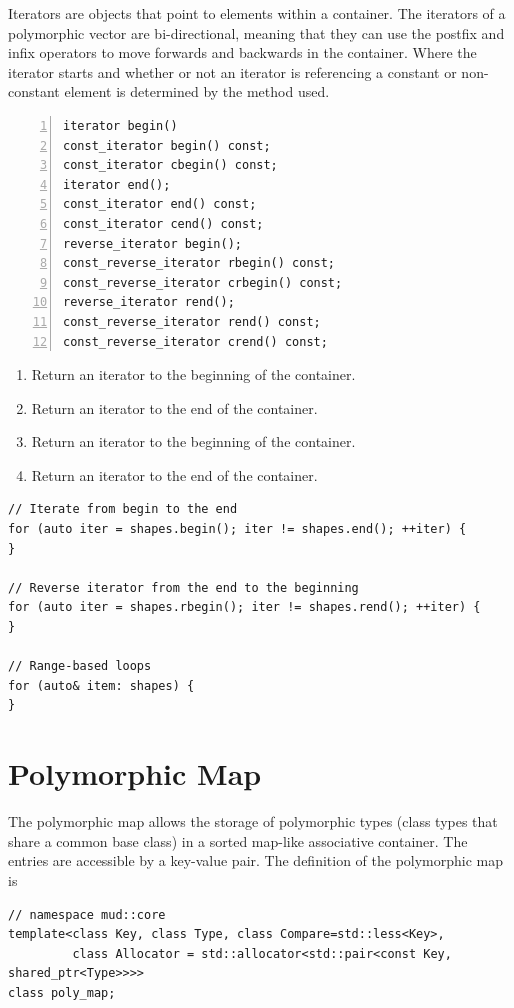 \documentclass[10pt,a4paper,openany]{mudbook}
\newenvironment{enumeratedef}
  {\begin{enumerate}[topsep=0.5em,itemsep=0em,parsep=0em,font=\small]
     \small}
  {\end{enumerate}}
\begin{document}
Iterators are objects that point to elements within a container. The iterators
of a polymorphic vector are bi-directional, meaning that they can use the
postfix and infix operators to move forwards and backwards in the container.
Where the iterator starts and whether or not an iterator is referencing a
constant or non-constant element is determined by the method used.

\begin{lstlisting}[style=definition,numbers=left]
iterator begin()
const_iterator begin() const;
const_iterator cbegin() const;
iterator end();
const_iterator end() const;
const_iterator cend() const;
reverse_iterator begin();
const_reverse_iterator rbegin() const;
const_reverse_iterator crbegin() const;
reverse_iterator rend();
const_reverse_iterator rend() const;
const_reverse_iterator crend() const;
\end{lstlisting}
\begin{enumeratedef}
  \item[1-3] Return an iterator to the beginning of the container.
  \item[4-6] Return an iterator to the end of the container.
  \item[7-9] Return an iterator to the beginning of the container.
  \item[10-12] Return an iterator to the end of the container.
\end{enumeratedef}

\begin{lstlisting}[style=snippet]
// Iterate from begin to the end
for (auto iter = shapes.begin(); iter != shapes.end(); ++iter) {
}

// Reverse iterator from the end to the beginning
for (auto iter = shapes.rbegin(); iter != shapes.rend(); ++iter) {
}

// Range-based loops
for (auto& item: shapes) {
}
\end{lstlisting}

\section{Polymorphic Map}
\label{sct:poly_map}

The polymorphic map allows the storage of polymorphic types (class types
that share a common base class) in a sorted map-like associative container. The
entries are accessible by a key-value pair. The definition of the polymorphic map is

\begin{lstlisting}[style=definition]
// namespace mud::core
template<class Key, class Type, class Compare=std::less<Key>,
         class Allocator = std::allocator<std::pair<const Key, shared_ptr<Type>>>>
class poly_map;
\end{lstlisting}
\end{document}
